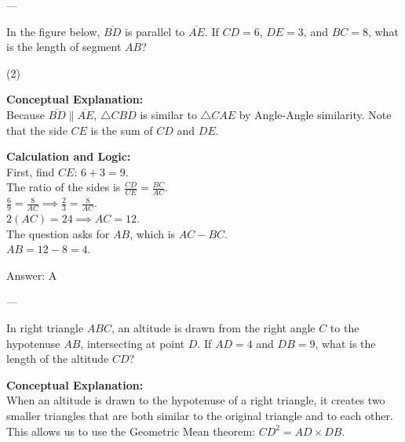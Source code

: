 \documentclass[11pt,paper=a4,answers]{exam}
\begin{document}
\begin{questions}
---

\question
In the figure below, $\overline{BD}$ is parallel to $\overline{AE}$. If $CD = 6$, $DE = 3$, and $BC = 8$, what is the length of segment $AB$?
\begin{center}
\end{center}
\begin{tasks}(2)
\end{tasks}

\begin{solution}
\textbf{Conceptual Explanation:} \\
Because $\overline{BD} \parallel \overline{AE}$, $\triangle CBD$ is similar to $\triangle CAE$ by Angle-Angle similarity. Note that the side $CE$ is the sum of $CD$ and $DE$.

\vspace{10pt}
\textbf{Calculation and Logic:} \\
First, find $CE$: $6 + 3 = 9$. \\
The ratio of the sides is $\frac{CD}{CE} = \frac{BC}{AC}$. \\
$\frac{6}{9} = \frac{8}{AC} \implies \frac{2}{3} = \frac{8}{AC}$. \\
$2(AC) = 24 \implies AC = 12$. \\
The question asks for $AB$, which is $AC - BC$. \\
$AB = 12 - 8 = 4$.

\vspace{15pt}
Answer: \colorbox{yellow!100}{A}
\end{solution}

---

\question
In right triangle $ABC$, an altitude is drawn from the right angle $C$ to the hypotenuse $AB$, intersecting at point $D$. If $AD = 4$ and $DB = 9$, what is the length of the altitude $CD$?

\begin{solution}
\textbf{Conceptual Explanation:} \\
When an altitude is drawn to the hypotenuse of a right triangle, it creates two smaller triangles that are both similar to the original triangle and to each other. This allows us to use the Geometric Mean theorem: $CD^2 = AD \times DB$.


\end{solution}
\end{questions}
\end{document}
